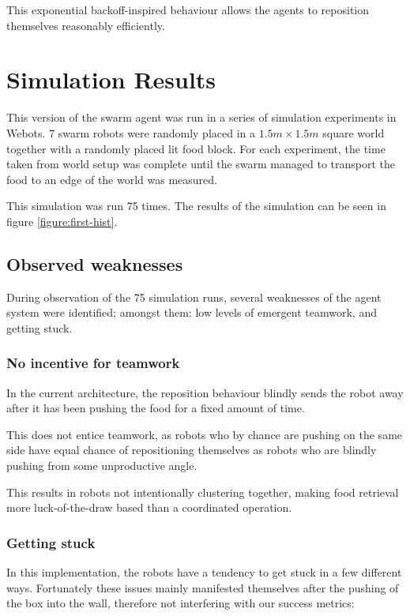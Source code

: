 \documentclass[a4paper]{article}
\begin{document}
This exponential backoff-inspired behaviour allows the agents to reposition themselves reasonably efficiently.

\section{Simulation Results}
\label{section:first-sim-results}

This version of the swarm agent was run in a series of simulation experiments in Webots.
7 swarm robots were randomly placed in a $ 1.5m \times 1.5m $ square world together with a randomly placed lit food block.
For each experiment, the time taken from world setup was complete until the swarm managed to transport the food to an edge of the world was measured.

This simulation was run 75 times.
The results of the simulation can be seen in figure \vref{figure:first-hist}.

\subsection{Observed weaknesses}

During observation of the 75 simulation runs, several weaknesses of the agent system were identified; amongst them: low levels of emergent teamwork, and getting stuck.

\subsubsection{No incentive for teamwork}
In the current architecture, the reposition behaviour blindly sends the robot away after it has been pushing the food for a fixed amount of time.

This does not entice teamwork, as robots who by chance are pushing on the same side have equal chance of repositioning themselves as robots who are blindly pushing from some unproductive angle.

This results in robots not intentionally clustering together, making food retrieval more luck-of-the-draw based than a coordinated operation.

\subsubsection{Getting stuck}
In this implementation, the robots have a tendency to get stuck in a few different ways. Fortunately these issues mainly manifested themselves after the pushing of the box into the wall, therefore not interfering with our success metrics:
\end{document}
